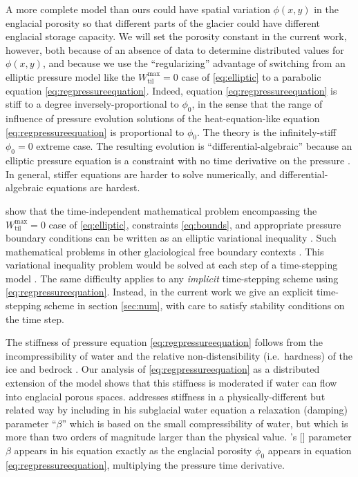 \documentclass[gmd]{copernicus}   %
\newcommand{\text}{\textrm}
\newcommand{\Wtilmax}{W_{\text{til}}^{\text{max}}}
\newcommand{\citeapos}[1]{\citeauthor{#1}'s [\citeyear{#1}]}
\begin{document}
A more complete model than ours could have spatial variation $\phi(x,y)$ in the englacial porosity so that different parts of the glacier could have different englacial storage capacity.  We will set the porosity constant in the current work, however, both because of an absence of data to determine distributed values for $\phi(x,y)$, and because we use the ``regularizing'' advantage of switching from an elliptic pressure model like the $\Wtilmax=0$ case of \eqref{eq:elliptic} to a parabolic equation \eqref{eq:regpressureequation}.  Indeed, equation \eqref{eq:regpressureequation} is stiff to a degree inversely-proportional to $\phi_0$, in the sense that the range of influence of pressure evolution solutions of the heat-equation-like equation \eqref{eq:regpressureequation} is proportional to $\phi_0$.  The \cite{Schoofetal2012} theory is the infinitely-stiff $\phi_0=0$ extreme case.  The resulting evolution is ``differential-algebraic'' because an elliptic pressure equation is a constraint with no time derivative on the pressure \citep{AscherPetzold}.  In general, stiffer equations are harder to solve numerically, and differential-algebraic equations are hardest.

\cite{Schoofetal2012} show that the time-independent mathematical problem encompassing the $\Wtilmax=0$ case of \eqref{eq:elliptic}, constraints \eqref{eq:bounds}, and appropriate pressure boundary conditions can be written as an elliptic variational inequality \citep{KinderlehrerStampacchia}.  Such mathematical problems in other glaciological free boundary contexts \citep{SchoofStream,JouvetBueler2012}.  This variational inequality problem would be solved at each step of a time-stepping model \citep{Hewitt2013}.  The same difficulty applies to any \emph{implicit} time-stepping scheme using \eqref{eq:regpressureequation}.  Instead, in the current work we give an explicit time-stepping scheme in section \ref{sec:num}, with care to satisfy stability conditions on the time step.

The stiffness of pressure equation \eqref{eq:regpressureequation} follows from the incompressibility of water and the relative non-distensibility (i.e.~hardness) of the ice and bedrock \citep{Clarke2003}.  Our analysis of \eqref{eq:regpressureequation} as a distributed extension of the \cite{Bartholomausetal2011} model shows that this stiffness is moderated if water can flow into englacial porous spaces.  \cite{Clarke2003} addresses stiffness in a physically-different but related way by including in his subglacial water equation a relaxation (damping) parameter  ``$\beta$'' which is based on the small compressibility of water, but which is more than two orders of magnitude larger than the physical value.  \citeapos{Clarke2003} parameter $\beta$ appears in his equation exactly as the englacial porosity $\phi_0$ appears in equation \eqref{eq:regpressureequation}, multiplying the pressure time derivative.
  
\end{document}
